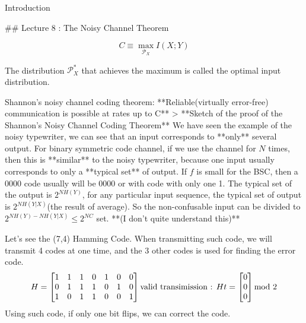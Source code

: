 \documentclass{beamer}
\begin{document}
\begin{frame}[allowframebreaks]{Introduction}
    
    ## Lecture 8 : The Noisy Channel Theorem
    
    $$C\equiv \max_{\mathcal{P}_X} I(X;Y)$$
    
    The distribution $\mathcal{P}_X^*$ that achieves the maximum is called the optimal input distribution.
    
    Shannon's noisy channel coding theorem: **Reliable(virtually error-free) communication is possible at rates up to C**  
    > **Sketch of the proof of the Shannon's Noisy Channel Coding Theorem**
    We have seen the example of the noisy typewriter, we can see that an input corresponds to **only** several output. For binary symmetric code channel, if we use the channel for $N$ times, then this is **similar** to the noisy typewriter, because one input usually corresponds to only a **typical set** of output. If $f$ is small for the BSC, then a 0000 code usually will be 0000 or with code with only one 1. 
    The typical set of the output is $2^{NH(Y)}$, for any particular input sequence, the typical set of output is $2^{NH(Y|X)}$(the result of average). So the non-confusable input can be divided to $2^{NH(Y)-NH(Y|X)}\le2^{NC}$ set. **(I don't quite understand this)**
    
    Let's see the (7,4) Hamming Code. When transmitting such code, we will transmit 4 codes at one time, and the 3 other codes is used for finding the error code. 
    $$H=\begin{bmatrix}
        1  & 1 & 1 & 0 & 1 & 0 & 0 \\
        0  & 1 & 1 & 1 & 0 & 1 & 0 \\
        1  & 0 & 1 & 1 & 0 & 0 & 1
    \end{bmatrix} \\ 
    \text{valid transimission : } Ht = \begin{bmatrix} 0 \\ 0 \\0 \end{bmatrix} \text{mod 2}$$ 
    Using such code, if only one bit flips, we can correct the code.
    

\end{frame}
\end{document}
